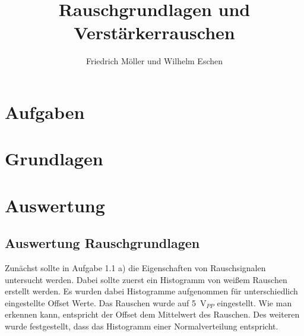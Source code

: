 \documentclass{article}						%
\title{Rauschgrundlagen und Verstärkerrauschen}
\author{Friedrich Möller und Wilhelm Eschen}
\begin{document}
	\maketitle
	\tableofcontents
	\clearpage
			

\section{Aufgaben}

\clearpage

\section{Grundlagen}
				
\clearpage
				 
\section{Auswertung}
	\subsection{Auswertung Rauschgrundlagen}
		Zunächst sollte in Aufgabe 1.1 a) die Eigenschaften von Rauschsignalen untersucht werden. Dabei sollte zuerst ein Histogramm von weißem Rauschen erstellt werden. Es wurden dabei Histogramme aufgenommen für unterschiedlich eingestellte Offset Werte. Das Rauschen wurde auf \SI{5}{\volt}$_{PP}$ eingestellt. Wie man erkennen kann, entspricht der Offset dem Mittelwert des Rauschen. Des weiteren wurde festgestellt, dass das Histogramm einer Normalverteilung entspricht.
		
\end{document}
